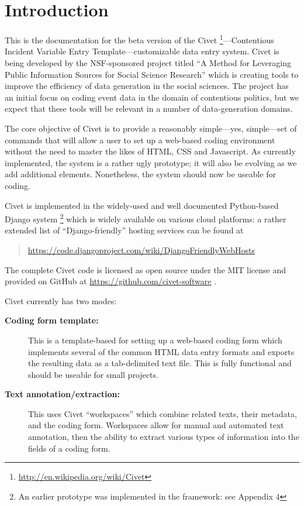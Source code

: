 \documentclass[letterpaper,10pt,english]{sphinxmanual}
\begin{document}
\chapter{Introduction}
\label{intro:introduction}\label{intro::doc}\label{intro:id1}
This is the documentation for the beta version of the
Civet \footnote{
\href{http://en.wikipedia.org/wiki/Civet}{http://en.wikipedia.org/wiki/Civet}
}—Contentious Incident Variable Entry Template—customizable
data entry system. Civet is being developed by the NSF-sponsored project
titled “A Method for Leveraging Public Information Sources for Social
Science Research” which is creating tools to improve the efficiency of
data generation in the social sciences. The project has an initial focus
on coding event data in the domain of contentious politics, but we
expect that these tools will be relevant in a number of data-generation
domains.

The core objective of Civet is to provide a reasonably simple—yes,
simple—set of commands that will allow a user to set up a web-based
coding environment without the need to master the likes of HTML, CSS and
Javascript. As currently implemented, the system is a rather ugly
prototype; it will also be evolving as we add additional elements.
Nonetheless, the system should now be useable for coding.

Civet is implemented in the widely-used and well documented
Python-based Django system \footnote{
An earlier prototype was implemented in the  framework: see
Appendix 4
} which is widely available on various
cloud platforms: a rather extended list of “Django-friendly” hosting
services can be found at
\begin{quote}

\href{https://code.djangoproject.com/wiki/DjangoFriendlyWebHosts}{https://code.djangoproject.com/wiki/DjangoFriendlyWebHosts}
\end{quote}

The complete Civet code is licensed as open source under the MIT
license and provided on GitHub at \href{https://github.com/civet-software}{https://github.com/civet-software} .

Civet currently has two modes:
\begin{description}
\item[{\textbf{Coding form template:}}] \leavevmode
This is a template-based for setting up a web-based coding form
which implements several of the common HTML data entry formats and
exports the resulting data as a tab-delimited text file. This is
fully functional and should be useable for small projects.

\item[{\textbf{Text annotation/extraction:}}] \leavevmode
This uses Civet “workspaces” which combine related texts, their
metadata, and the coding form. Workspaces allow for manual and
automated text annotation, then the ability to extract various types
of information into the fields of a coding form.

\end{description}
\end{document}
